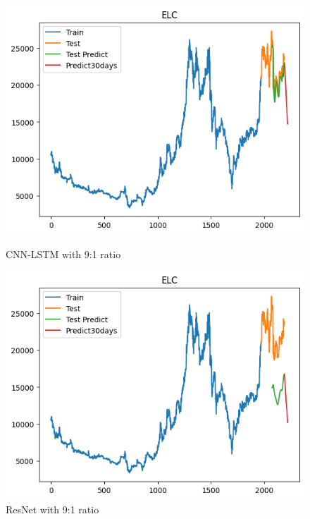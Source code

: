 \documentclass[conference]{IEEEtran}
\begin{document}
\begin{figure}[H]
    \centering
    \begin{minipage}{0.24\textwidth}
        \centering
        \includegraphics[width=\textwidth]{Figure/ELC/cnnlstm91.png}
        \caption{CNN-LSTM with 9:1 ratio}
        \label{fig:image1}
    \end{minipage}
    \hfill
    \begin{minipage}{0.24\textwidth}
        \centering
        \includegraphics[width=\textwidth]{Figure/ELC/resnet91.png}
        \caption{ResNet with 9:1 ratio}
        \label{fig:image2}
    \end{minipage}
\end{figure}
\end{document}
